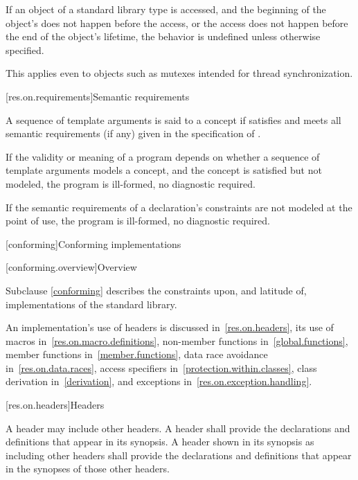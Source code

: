 \pnum
If an object of a standard library type is accessed, and
the beginning of the object's 
does not happen before the access, or
the access does not happen before the end of the object's lifetime,
the behavior is undefined unless otherwise specified.
\begin{note}
This applies even to objects such as mutexes intended for thread synchronization.
\end{note}

[res.on.requirements]{Semantic requirements}

\pnum
A sequence  of template arguments is said to
%
 a concept 
if 
satisfies  and
meets all semantic requirements (if any)
given in the specification of .

\pnum
If the validity or meaning of a program
depends on whether a sequence of template arguments models a concept, and
the concept is satisfied but not modeled,
the program is ill-formed, no diagnostic required.

\pnum
If the semantic requirements of a declaration's
constraints are not modeled at the point of use,
the program is ill-formed, no diagnostic required.

[conforming]{Conforming implementations}

[conforming.overview]{Overview}

\pnum
Subclause \ref{conforming} describes the constraints upon, and latitude of, implementations of the \Cpp{} standard library.

\pnum
An implementation's use of headers is discussed in~\ref{res.on.headers}, its use
of macros in~\ref{res.on.macro.definitions}, non-member functions
in~\ref{global.functions}, member functions in~\ref{member.functions}, data race
avoidance in~\ref{res.on.data.races}, access specifiers
in~\ref{protection.within.classes}, class derivation in~\ref{derivation}, and
exceptions in~\ref{res.on.exception.handling}.

[res.on.headers]{Headers}

\pnum
A \Cpp{} header may include other \Cpp{} headers.
A \Cpp{} header shall provide the declarations and definitions that appear in its
synopsis. A \Cpp{} header shown in its synopsis as including other \Cpp{} headers
shall provide the declarations and definitions that appear in the synopses of
those other headers.

